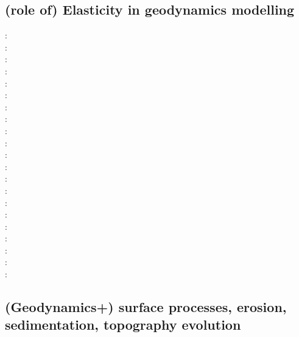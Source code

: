 \cite{haha05}
\cite{erhh13}

\subsection{(role of) Elasticity in geodynamics modelling}

{\scriptsize
\nineteeneightyfour:\cite{yusa84}\\
\nineteenninetyfive:\cite{budi95}\\
\nineteenninetysix:\cite{hach96}\\
\nineteenninetyeight:\cite{copo98}\\
\twothousandone:\cite{vapy01}\\
\twothousandtwo:\cite{mumh02}\cite{modm02}\\
\twothousandthree:\cite{hukm03}\cite{wabu03}\\
\twothousandfive:\cite{mure05}\\
\twothousandsix:\cite{kapo06}\cite{mudm06}\\
\twothousandseven:\cite{kabe07}\\
\twothousandeight:\cite{baso08}\cite{fukk08}\\
\twothousandnine:\cite{qurj09}\\
\twothousandten:\cite{bepo10}\\
\twothousandtwelve:\cite{gerb12}\cite{kasc12}\\
\twothousandthirteen:\cite{wahd13}\\
\twothousandfourteen:\cite{famc14}\cite{fogm14}\cite{olbe14}\cite{hepk14}\\
\twothousandfifteen:\cite{thkp15}\\
\twothousandsixteen:\cite{bafl16}\cite{jads16}\cite{olbm16}\cite{bafl16}\\
\twothousandseventeen:\cite{pact17}\\
\twothousandeighteen:\cite{dusd18}\\
\twothousandnineteen:\cite{pact19}
}

\subsection{(Geodynamics+) surface processes, erosion, sedimentation, topography evolution}


